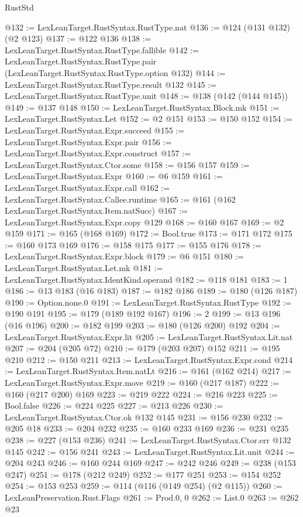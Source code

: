 \begin{lexlean}{RustStd}
\begin{coremodule}
@132 := LexLeanTarget.RustSyntax.RustType.nat
@136 := @124 (@131 @132) (@2 @123)
@137 := @122 @136
@138 := LexLeanTarget.RustSyntax.RustType.fallible
@142 := LexLeanTarget.RustSyntax.RustType.pair (LexLeanTarget.RustSyntax.RustType.option @132)
@144 := LexLeanTarget.RustSyntax.RustType.result @132
@145 := LexLeanTarget.RustSyntax.RustType.unit
@148 := @138 (@142 (@144 @145))
@149 := @137 @148
@150 := LexLeanTarget.RustSyntax.Block.mk
@151 := LexLeanTarget.RustSyntax.Let
@152 := @2 @151
@153 := @150 @152
@154 := LexLeanTarget.RustSyntax.Expr.succeed
@155 := LexLeanTarget.RustSyntax.Expr.pair
@156 := LexLeanTarget.RustSyntax.Expr.construct
@157 := LexLeanTarget.RustSyntax.Ctor.some
@158 := @156 @157
@159 := LexLeanTarget.RustSyntax.Expr
@160 := @6 @159
@161 := LexLeanTarget.RustSyntax.Expr.call
@162 := LexLeanTarget.RustSyntax.Callee.runtime
@165 := @161 (@162 LexLeanTarget.RustSyntax.Item.natSucc)
@167 := LexLeanTarget.RustSyntax.Expr.copy @129
@168 := @160 @167
@169 := @2 @159
@171 := @165 (@168 @169)
@172 := Bool.true
@173 := @171 @172
@175 := @160 @173 @169
@176 := @158 @175
@177 := @155 @176
@178 := LexLeanTarget.RustSyntax.Expr.block
@179 := @6 @151
@180 := LexLeanTarget.RustSyntax.Let.mk
@181 := LexLeanTarget.RustSyntax.IdentKind.operand
@182 := @118 @181
@183 := 1
@186 := @13 @183 (@16 @183)
@187 := @182 @186
@189 := @180 (@126 @187)
@190 := Option.none.{0}
@191 := LexLeanTarget.RustSyntax.RustType
@192 := @190 @191
@195 := @179 (@189 @192 @167)
@196 := 2
@199 := @13 @196 (@16 @196)
@200 := @182 @199
@203 := @180 (@126 @200) @192
@204 := LexLeanTarget.RustSyntax.Expr.lit
@205 := LexLeanTarget.RustSyntax.Lit.nat
@207 := @204 (@205 @72)
@210 := @179 (@203 @207) @152
@211 := @195 @210
@212 := @150 @211
@213 := LexLeanTarget.RustSyntax.Expr.cond
@214 := LexLeanTarget.RustSyntax.Item.natLt
@216 := @161 (@162 @214)
@217 := LexLeanTarget.RustSyntax.Expr.move
@219 := @160 (@217 @187)
@222 := @160 (@217 @200) @169
@223 := @219 @222
@224 := @216 @223
@225 := Bool.false
@226 := @224 @225
@227 := @213 @226
@230 := LexLeanTarget.RustSyntax.Ctor.ok @132 @145
@231 := @156 @230
@232 := @205 @18
@233 := @204 @232
@235 := @160 @233 @169
@236 := @231 @235
@238 := @227 (@153 @236)
@241 := LexLeanTarget.RustSyntax.Ctor.err @132 @145
@242 := @156 @241
@243 := LexLeanTarget.RustSyntax.Lit.unit
@244 := @204 @243
@246 := @160 @244 @169
@247 := @242 @246
@249 := @238 (@153 @247)
@251 := @178 (@212 @249)
@252 := @177 @251
@253 := @154 @252
@254 := @153 @253
@259 := @114 (@116 (@149 @254) (@2 @115))
@260 := LexLeanPreservation.Rust.Flags
@261 := Prod.{0, 0}
@262 := List.{0}
@263 := @262 @23

\end{coremodule}
\end{lexlean}
